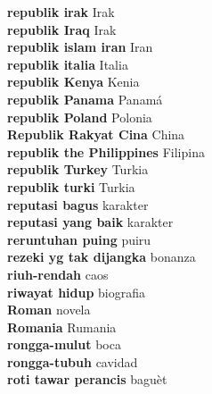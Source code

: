\textbf{ republik irak  } Irak \\
\textbf{ republik Iraq  } Irak \\
\textbf{ republik islam iran  } Iran \\
\textbf{ republik italia  } Italia \\
\textbf{ republik Kenya  } Kenia \\
\textbf{ republik Panama  } Panamá \\
\textbf{ republik Poland  } Polonia \\
\textbf{ Republik Rakyat Cina  } China \\
\textbf{ republik the Philippines  } Filipina \\
\textbf{ republik Turkey  } Turkia \\
\textbf{ republik turki  } Turkia \\
\textbf{ reputasi bagus  } karakter \\
\textbf{ reputasi yang baik  } karakter \\
\textbf{ reruntuhan puing  } puiru \\
\textbf{ rezeki yg tak dijangka  } bonanza \\
\textbf{ riuh-rendah  } caos \\
\textbf{ riwayat hidup  } biografia \\
\textbf{ Roman  } novela \\
\textbf{ Romania  } Rumania \\
\textbf{ rongga-mulut  } boca \\
\textbf{ rongga-tubuh  } cavidad \\
\textbf{ roti tawar perancis  } baguèt \\
